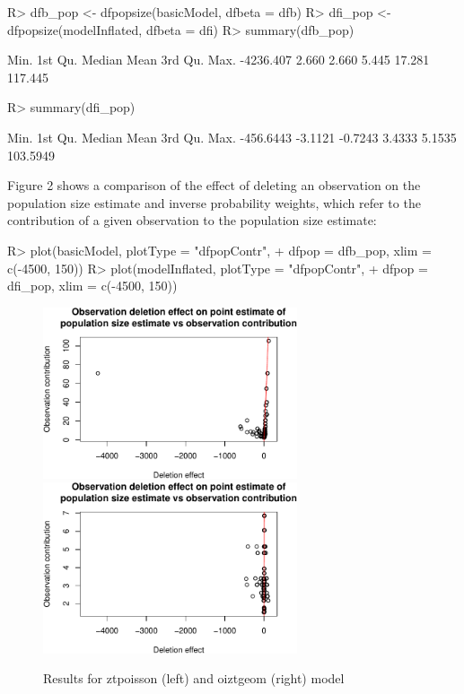 \documentclass[
]{jss}
\newcommand{\1}{\mathcal{I}} \newcommand{\bZero}{\boldsymbol{0}}
\begin{document}
\begin{CodeChunk}
\begin{CodeInput}
R> dfb_pop <- dfpopsize(basicModel, dfbeta = dfb)
R> dfi_pop <- dfpopsize(modelInflated, dfbeta = dfi)
R> summary(dfb_pop)
\end{CodeInput}
\begin{CodeOutput}
     Min.   1st Qu.    Median      Mean   3rd Qu.      Max. 
-4236.407     2.660     2.660     5.445    17.281   117.445 
\end{CodeOutput}
\begin{CodeInput}
R> summary(dfi_pop)
\end{CodeInput}
\begin{CodeOutput}
     Min.   1st Qu.    Median      Mean   3rd Qu.      Max. 
-456.6443   -3.1121   -0.7243    3.4333    5.1535  103.5949 
\end{CodeOutput}
\end{CodeChunk}

Figure 2 shows a comparison of the effect of deleting an observation on
the population size estimate and inverse probability weights, which
refer to the contribution of a given observation to the population size
estimate:

\begin{CodeChunk}
\begin{CodeInput}
R> plot(basicModel, plotType = "dfpopContr", 
+      dfpop = dfb_pop, xlim = c(-4500, 150))
R> plot(modelInflated, plotType = "dfpopContr", 
+      dfpop = dfi_pop, xlim = c(-4500, 150))
\end{CodeInput}
\begin{figure}[ht]

{\centering \includegraphics[width=7.5cm]{singleRcapture_files/figure-latex/dfpopsize_plot-1} \includegraphics[width=7.5cm]{singleRcapture_files/figure-latex/dfpopsize_plot-2} 

}

\caption[Results for ztpoisson (left) and oiztgeom (right) model]{Results for ztpoisson (left) and oiztgeom (right) model}\label{fig:dfpopsize_plot}
\end{figure}
\end{CodeChunk}
\end{document}
